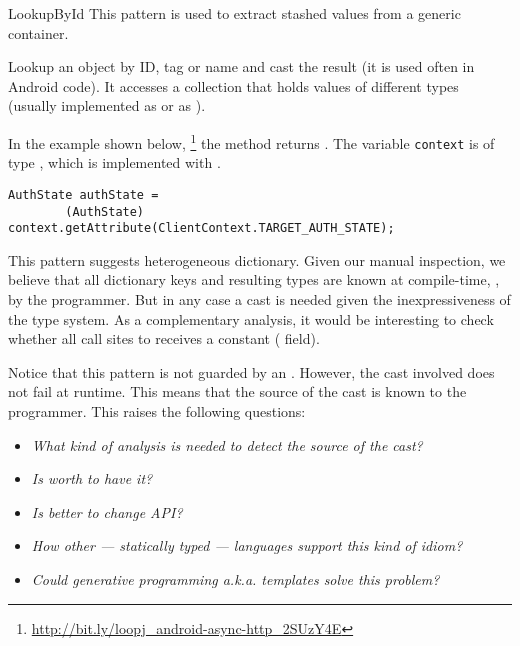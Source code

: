 \begin{pattern}{LookupById}
This pattern is used to extract stashed values from a generic container.

Lookup an object by ID, tag or name and cast the result
(it is used often in Android code).
It accesses a collection that holds values of different types
(usually implemented as  or as ).

\instances{}
In the example shown below,%
\footnote{\url{http://bit.ly/loopj_android-async-http_2SUzY4E}}
the  method returns .
The variable \texttt{context} is of type ,
which is implemented with .

\begin{verbatim}
AuthState authState =
        (AuthState) context.getAttribute(ClientContext.TARGET_AUTH_STATE);
\end{verbatim}

\discussion{}
%
%
This pattern suggests heterogeneous dictionary.
Given our manual inspection,
we believe that all dictionary keys and resulting types are known at
compile-time, \ie, by the programmer.
%
%
But in any case a cast is needed given the inexpressiveness of the type system.
As a complementary analysis,
it would be interesting to check whether all call sites to
 receives a constant ( field).

Notice that this pattern is not guarded by an .
However, the cast involved does not fail at runtime.
This means that the source of the cast is known to the programmer.
This raises the following questions:
\begin{itemize}
\item \emph{What kind of analysis is needed to detect the source of the cast?}
\item \emph{Is worth to have it?}
\item \emph{Is better to change API?}
\item \emph{How other --- statically typed --- languages support this kind of idiom?}
\item \emph{Could generative programming a.k.a. templates solve this problem?}
\end{itemize}

\end{pattern}